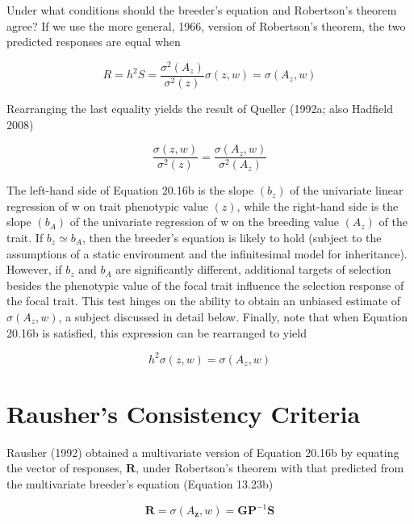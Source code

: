 \documentclass{article}
\begin{document}
Under what conditions should the breeder’s equation and Robertson’s theorem agree? If we use the more general, 1966, version of Robertson’s theorem, the two predicted responses are equal when

\begin{equation}
R=h^{2}S=\frac{\sigma^{2}(A_{z})}{\sigma^{2}(z)}\sigma(z,w)=\sigma(A_{z},w)
\tag{20.16a}
\label{eq:20_16a}
\end{equation}

Rearranging the last equality yields the result of Queller (1992a; also Hadfield 2008)

\begin{equation}
\frac{\sigma(z,w)}{\sigma^{2}(z)}=\frac{\sigma(A_{z},w)}{\sigma^{2}(A_{z})}
\tag{20.16b}
\label{eq:20_16b}
\end{equation}

The left-hand side of Equation 20.16b is the slope  $ (b_z) $ of the univariate linear regression of w on trait phenotypic value  $ (z) $, while the right-hand side is the slope  $ (b_A) $ of the univariate regression of w on the breeding value  $ (A_z) $ of the trait. If  $ b_z \simeq b_A $, then the breeder's equation is likely to hold (subject to the assumptions of a static environment and the infinitesimal model for inheritance). However, if  $ b_z $ and  $ b_A $ are significantly different, additional targets of selection besides the phenotypic value of the focal trait influence the selection response of the focal trait. This test hinges on the ability to obtain an unbiased estimate of  $ \sigma(A_z, w) $, a subject discussed in detail below. Finally, note that when Equation 20.16b is satisfied, this expression can be rearranged to yield

\begin{equation}
h^{2}\sigma(z,w)=\sigma(A_{z},w)
\tag{20.16c}
\label{eq:20_16c}
\end{equation}

\section{Rausher's Consistency Criteria}
Rausher (1992) obtained a multivariate version of Equation 20.16b by equating the vector of responses,  $ \mathbf{R} $, under Robertson's theorem with that predicted from the multivariate breeder's equation (Equation 13.23b)

\begin{equation}
\mathbf{R}=\sigma(A_{\mathbf{z}},w)=\mathbf{G}\mathbf{P}^{-1}\mathbf{S}
\tag{20.17a}
\label{eq:20_17a}
\end{equation}
\end{document}
